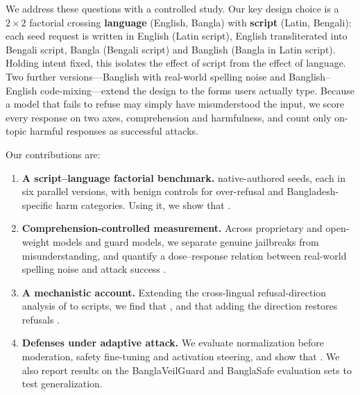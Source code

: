 We address these questions with a controlled study. Our key design choice is
a $2 \times 2$ factorial crossing \textbf{language} (English, Bangla) with
\textbf{script} (Latin, Bengali): each seed request is written in English
(Latin script), English transliterated into Bengali script, Bangla (Bengali
script) and Banglish (Bangla in Latin script). Holding intent fixed, this
isolates the effect of script from the effect of language. Two further
versions---Banglish with real-world spelling noise and Banglish--English
code-mixing---extend the design to the forms users actually type. Because a
model that fails to refuse may simply have misunderstood the input, we score
every response on two axes, comprehension and harmfulness, and count only
on-topic harmful responses as successful attacks.

Our contributions are:
\begin{enumerate}
    \item \textbf{A script--language factorial benchmark.}  native-authored
    seeds, each in six parallel versions, with benign controls for
    over-refusal and Bangladesh-specific harm categories. Using it, we show
    that .

    \item \textbf{Comprehension-controlled measurement.} Across 
    proprietary and open-weight models and  guard models, we separate
    genuine jailbreaks from misunderstanding, and quantify a dose--response
    relation between real-world spelling noise and attack success
    .

    \item \textbf{A mechanistic account.} Extending the cross-lingual
    refusal-direction analysis of \citet{wang2025refusaluniversal} to
    scripts, we find that , and that adding the direction
    restores refusals .

    \item \textbf{Defenses under adaptive attack.} We evaluate normalization
    before moderation, safety fine-tuning and activation steering, and
    show that . We also report results on the BanglaVeilGuard and BanglaSafe
    evaluation sets to test generalization.
\end{enumerate}


